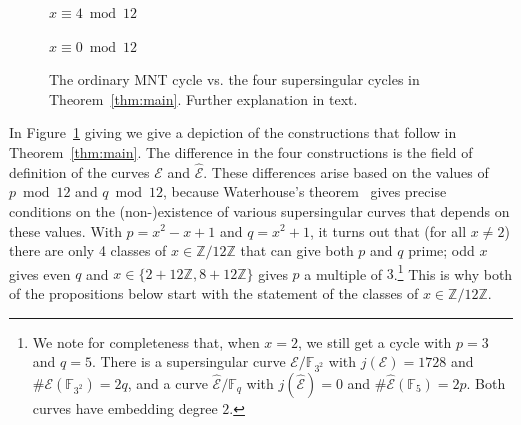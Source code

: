 \documentclass[version=preprint]{iacrcc}
\newcommand{\Z}{\mathbb{Z}}
\newcommand{\F}{\mathbb{F}}
\newcommand{\EC}{\mathcal{E}}
\begin{document}
\begin{figure}[!ht]
\begin{minipage}[b]{0.24\linewidth}
		$ x \equiv 4 \bmod{12}$
	\end{minipage}
%
	\begin{minipage}[b]{0.24\linewidth}
		\centering
		$ x \equiv 0 \bmod{12}$
	\end{minipage}
	\caption{The ordinary MNT cycle vs. the four supersingular cycles in Theorem~\ref{thm:main}. Further explanation in text.}
	\label{fig:superMNT}
\end{figure}

In Figure~\ref{fig:superMNT} giving we give a depiction of the constructions that follow in Theorem~\ref{thm:main}. The difference in the four constructions is the field of definition of the curves $\EC$ and $\hat{\EC}$. These differences arise based on the values of $p \bmod{12}$ and $q \bmod{12}$, because Waterhouse's theorem~\cite[Theorem 4.1]{waterhouse} gives precise conditions on the (non-)existence of various supersingular curves that depends on these values. With $p=x^2-x+1$ and $q=x^2+1$, it turns out that (for all $x \neq 2$) there are only 4 classes of $x \in \Z/12\Z$ that can give both $p$ and $q$ prime; odd $x$ gives even $q$ and $x \in \{2 + 12 \Z, 8 +12 \Z\}$ gives $p$ a multiple of $3$.\footnote{We note for completeness that, when $x=2$, we still get a cycle with $p=3$ and $q=5$. There is a supersingular curve $\EC/\F_{3^2}$ with $j(\EC)=1728$ and $\#\EC(\F_{3^2})=2q$, and a curve $\hat{\EC}/\F_{q}$ with $j(\hat{\EC})=0$ and $\#\hat{\EC}(\F_{5})=2p$. Both curves have embedding degree $2$.} This is why both of the propositions below start with the statement of the classes of $x \in \Z/12\Z$. 
\end{document}
